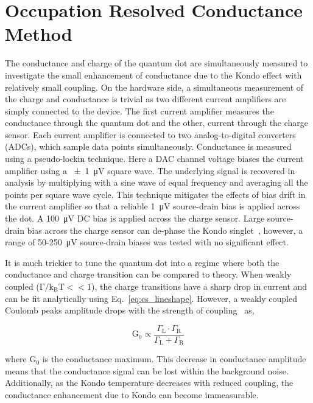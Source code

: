 \section{Occupation Resolved Conductance Method}
The conductance and charge of the quantum dot are simultaneously measured to investigate the small enhancement of conductance due to the Kondo effect with relatively small coupling. On the hardware side, a simultaneous measurement of the charge and conductance is trivial as two different current amplifiers are simply connected to the device. 
The first current amplifier measures the conductance through the quantum dot and the other, current through the charge sensor. Each current amplifier is connected to two analog-to-digital converters (ADCs), which sample data points simultaneously. 
Conductance is measured using a pseudo-lockin technique. Here a DAC channel voltage biases the current amplifier using a \qty{\pm1}{\micro V} square wave. The underlying signal is recovered in analysis by multiplying with a sine wave of equal frequency and averaging all the points per square wave cycle. This technique mitigates the effects of bias drift in the current amplifier so that a reliable \qty{1}{\micro V} source-drain bias is applied across the dot. 
A \qty{100}{\micro V} DC bias is applied across the charge sensor. Large source-drain bias across the charge sensor can de-phase the Kondo singlet~\cite{kondo_controlled_dephasing}, however, a range of 50-\qty{250}{\micro V} source-drain biases was tested with no significant effect.

It is much trickier to tune the quantum dot into a regime where both the conductance and charge transition can be compared to theory. When weakly coupled ($\mathrm{\Gamma/k_BT}<<1$), the charge transitions have a sharp drop in current and can be fit analytically using Eq.~\ref{eq:cs_lineshape}. However, a weakly coupled Coulomb peaks amplitude drops with the strength of coupling~\cite{Kouwenhoven_1997_electron_transport} as,


\begin{equation}\label{eq:cond_amp}
 \mathrm{G_0} \propto
 \frac{\Gamma_\mathrm{L}\cdot\Gamma_\mathrm{R}}{\Gamma_\mathrm{L}+\Gamma_\mathrm{R}}
\end{equation}


\noindent where $\mathrm{G_0}$ is the conductance maximum. This decrease in conductance amplitude means that the conductance signal can be lost within the background noise. Additionally, as the Kondo temperature decreases with reduced coupling, the conductance enhancement due to Kondo can become immeasurable.


